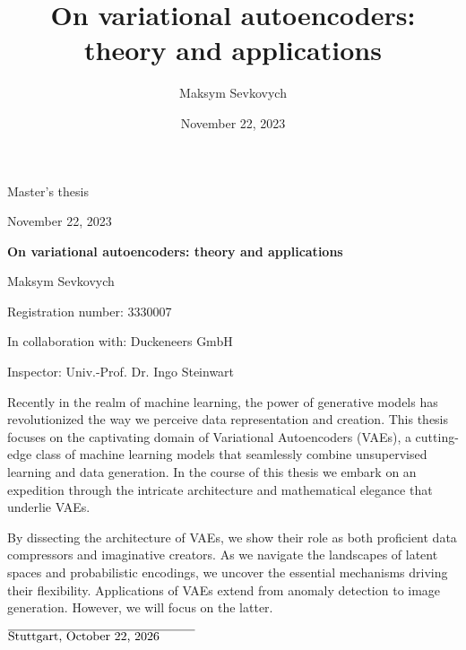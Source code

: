 \documentclass[12pt, a4paper]{report}
\title{On variational autoencoders: theory and applications}
\date{November 22, 2023}
\author{Maksym Sevkovych}
\theoremstyle{plain}
\theoremstyle{definition}
\theoremstyle{plain}
\begin{document}
\begin{titlepage}
\vspace*{1 cm}
\begin{center}
\LARGE{Master's thesis}

\vspace{0.5 cm}

\large{November 22, 2023}

\vspace{0.5 cm}

\Huge{\textbf{On variational autoencoders: theory and applications}}

\vspace{0.5 cm}

\Large{Maksym Sevkovych}

\Large{Registration number: 3330007}

\Large{In collaboration with: Duckeneers GmbH}
\vspace{1 cm}

\Large{Inspector: Univ.-Prof. Dr. Ingo Steinwart}
\vspace{3cm}
\end{center}
Recently in the realm of machine learning, the power of generative models has revolutionized the way we perceive data representation and creation. This thesis focuses on the captivating domain of Variational Autoencoders (VAEs), a cutting-edge class of machine learning models that seamlessly combine unsupervised learning and data generation. In the course of this thesis we embark on an expedition through the intricate architecture and mathematical elegance that underlie VAEs.

By dissecting the architecture of VAEs, we show their role as both proficient data compressors and imaginative creators. As we navigate the landscapes of latent spaces and probabilistic encodings, we uncover the essential mechanisms driving their flexibility.
Applications of VAEs extend from anomaly detection to image generation. However, we will focus on the latter.
\end{titlepage}
\newpage
\tableofcontents







\vspace{4 cm}

$\overline{\text{Stuttgart, \today} \hspace{1 cm}}$
\end{document}
